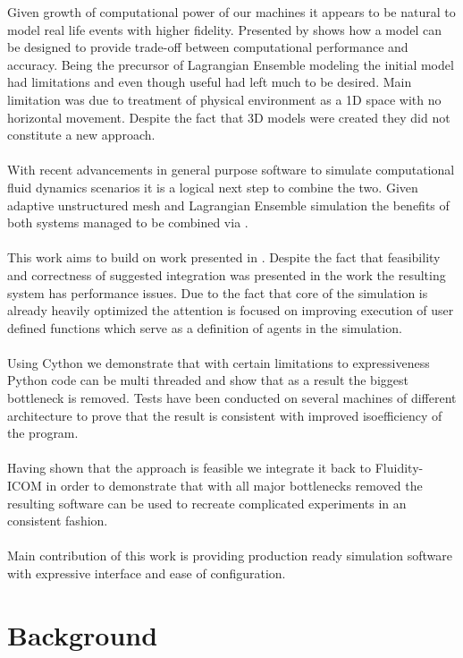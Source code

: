 \documentclass[12pt, a4paper]{report}
\begin{document}
Given growth of computational power of our machines it appears to be natural to model real life events with
higher fidelity. Presented by \cite{Woods2005} shows how a model can be designed to provide trade-off between
computational performance and accuracy. Being the precursor of Lagrangian Ensemble modeling the initial
model had limitations and even though useful had left much to be desired. Main limitation was due to treatment
of physical environment as a 1D space with no horizontal movement. Despite the fact that 3D models were created \cite{VEW3D}
they did not constitute a new approach.
\\\\
With recent advancements in general purpose software to simulate computational fluid dynamics \cite{Piggot2008,fluidity}
scenarios it is a logical next step to combine the two. Given adaptive unstructured mesh and Lagrangian Ensemble simulation
the benefits of both systems managed to be combined via \cite{FluidityVEW}.
\\\\
This work aims to build on work presented in \cite{FluidityVEW}. Despite the fact that feasibility and correctness of
suggested integration was presented in the work the resulting system has performance issues. Due to the fact that
core of the simulation is already heavily optimized the attention is focused on improving execution of user defined functions
which serve as a definition of agents in the simulation.
\\\\
Using Cython we demonstrate that with certain limitations to expressiveness Python code can be multi threaded and show
that as a result the biggest bottleneck is removed. Tests have been conducted on several machines of different architecture
to prove that the result is consistent with improved isoefficiency of the program.
\\\\
Having shown that the approach is feasible we integrate it back to Fluidity-ICOM in order to demonstrate that with all
major bottlenecks removed the resulting software can be used to recreate complicated experiments in an consistent fashion.
\\\\
Main contribution of this work is providing production ready simulation software with expressive interface and ease of
configuration.

\chapter{Background}\label{ch:bkg}
\end{document}
